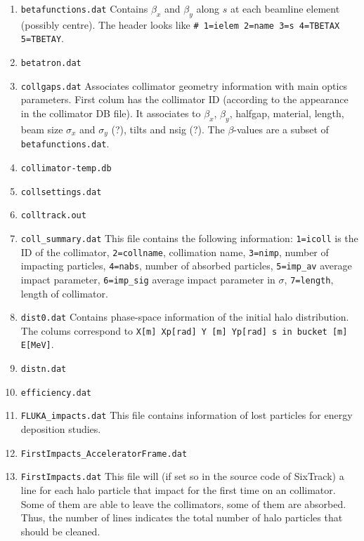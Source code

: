 \documentclass[a4paper, oneside, final]{scrartcl}
\begin{document}
{\begin{enumerate}
\item \texttt{betafunctions.dat} Contains $\beta_x$ and $\beta_y$ along $s$ at each beamline element (possibly centre). The header looks like \texttt{\# 1=ielem 2=name 3=s 4=TBETAX 5=TBETAY}.

\item \texttt{betatron.dat}
\item \texttt{collgaps.dat} Associates collimator geometry information with main optics parameters. First colum has the collimator ID (according to the appearance in the collimator DB file). It associates to $\beta_x$, $\beta_y$, halfgap, material, length, beam size $\sigma_x$ and $\sigma_y$ (?), tilts and nsig (?). The $\beta$-values are a subset of \texttt{betafunctions.dat}.

\item \texttt{collimator-temp.db}
\item \texttt{collsettings.dat}
\item \texttt{colltrack.out}

\item \texttt{coll\_summary.dat} This file contains the following information: \texttt{1=icoll} is the ID of the collimator, \texttt{2=collname}, collimation name, \texttt{3=nimp}, number of impacting particles, \texttt{4=nabs}, number of absorbed particles, \texttt{5=imp\_av} average impact parameter, \texttt{6=imp\_sig} average impact parameter in $\sigma$, \texttt{7=length}, length of collimator.

\item \texttt{dist0.dat} Contains phase-space information of the initial halo distribution. The colums correspond to \texttt{X[m]   Xp[rad]   Y [m]   Yp[rad]   s in bucket [m]  E[MeV]}.

\item \texttt{distn.dat}
\item \texttt{efficiency.dat} 

\item \texttt{FLUKA\_impacts.dat} This file contains information of lost particles for energy deposition studies. 

\item \texttt{FirstImpacts\_AcceleratorFrame.dat}
\item \texttt{FirstImpacts.dat} This file will (if set so in the source code of SixTrack) a line for each halo particle that impact for the first time on an collimator. Some of them are able to leave the collimators, some of them are absorbed. Thus, the number of lines indicates the total number of halo particles that should be cleaned.


\end{enumerate}}
\end{document}
